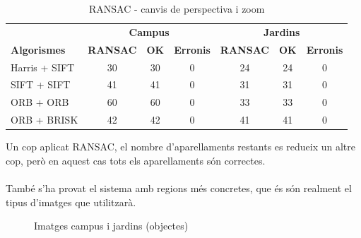 		\begin{table}[H]
			\begin{center}
				\begin{tabular}{l | c c c | c c c}
					& \multicolumn{3}{c|}{\textbf{Campus}} & \multicolumn{3}{c}{\textbf{Jardins}} \\
					\textbf{Algorismes} & \textbf{RANSAC} & \textbf{OK} & \textbf{Erronis} & \textbf{RANSAC} & \textbf{OK} & \textbf{Erronis} \\ \hline
					Harris + SIFT & 30 & 30 & 0 & 24 & 24 & 0 \\
					SIFT + SIFT & 41 & 41 & 0 & 31 & 31 & 0 \\
					ORB + ORB & 60 & 60 & 0 & 33 & 33 & 0 \\
					ORB + BRISK & 42 & 42 & 0 & 41 & 41 & 0 \\
				\end{tabular}
			\end{center}
			\caption{RANSAC - canvis de perspectiva i zoom}
		\end{table}
		\noindent
		Un cop aplicat RANSAC, el nombre d'aparellaments restants es redueix un altre cop, però en aquest cas tots els aparellaments són correctes.\\\\
		També s'ha provat el sistema amb regions més concretes, que és són realment el tipus d'imatges que utilitzarà.\\

		\begin{figure}[!htb]
			\caption{Imatges campus i jardins (objectes)}
		\end{figure}

